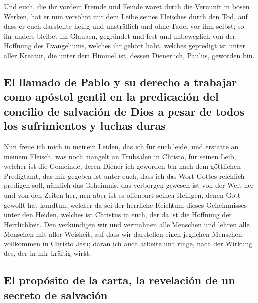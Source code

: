  Und euch, die ihr vordem Fremde und Feinde waret durch
die Vernunft in bösen Werken,  hat er nun versöhnt mit
dem Leibe seines Fleisches durch den Tod, auf dass er euch darstellte
heilig und unsträflich und ohne Tadel vor ihm selbst;  so
ihr anders bleibet im Glauben, gegründet und fest und unbeweglich von
der Hoffnung des Evangeliums, welches ihr gehört habt, welches gepredigt
ist unter aller Kreatur, die unter dem Himmel ist, dessen Diener ich,
Paulus, geworden bin.

\hypertarget{el-llamado-de-pablo-y-su-derecho-a-trabajar-como-apuxf3stol-gentil-en-la-predicaciuxf3n-del-concilio-de-salvaciuxf3n-de-dios-a-pesar-de-todos-los-sufrimientos-y-luchas-duras}{%
\subsection{El llamado de Pablo y su derecho a trabajar como apóstol
gentil en la predicación del concilio de salvación de Dios a pesar de
todos los sufrimientos y luchas
duras}\label{el-llamado-de-pablo-y-su-derecho-a-trabajar-como-apuxf3stol-gentil-en-la-predicaciuxf3n-del-concilio-de-salvaciuxf3n-de-dios-a-pesar-de-todos-los-sufrimientos-y-luchas-duras}}

 Nun freue ich mich in meinem Leiden, das ich für euch
leide, und erstatte an meinem Fleisch, was noch mangelt an Trübsalen in
Christo, für seinen Leib, welcher ist die Gemeinde, 
deren Diener ich geworden bin nach dem göttlichen Predigtamt, das mir
gegeben ist unter euch, dass ich das Wort Gottes reichlich predigen
soll,  nämlich das Geheimnis, das verborgen gewesen ist
von der Welt her und von den Zeiten her, nun aber ist es offenbart
seinen Heiligen,  denen Gott gewollt hat kundtun, welcher
da sei der herrliche Reichtum dieses Geheimnisses unter den Heiden,
welches ist Christus in euch, der da ist die Hoffnung der Herrlichkeit.
 Den verkündigen wir und vermahnen alle Menschen und
lehren alle Menschen mit aller Weisheit, auf dass wir darstellen einen
jeglichen Menschen vollkommen in Christo Jesu;  daran ich
auch arbeite und ringe, nach der Wirkung des, der in mir kräftig wirkt.

\hypertarget{el-propuxf3sito-de-la-carta-la-revelaciuxf3n-de-un-secreto-de-salvaciuxf3n}{%
\subsection{El propósito de la carta, la revelación de un secreto de
salvación}\label{el-propuxf3sito-de-la-carta-la-revelaciuxf3n-de-un-secreto-de-salvaciuxf3n}}

